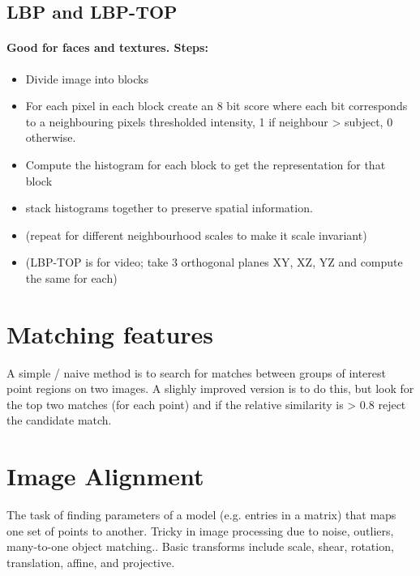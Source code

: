 \documentclass[]{article}
\begin{document}
	\subsection{LBP and LBP-TOP}
	\paragraph{Good for faces and textures. Steps:}
	\begin{itemize}
		\item Divide image into blocks
		\item For each pixel in each block create an 8 bit score where each bit corresponds to a neighbouring pixels thresholded intensity, 1 if neighbour > subject, 0 otherwise.
		\item Compute the histogram for each block to get the representation for that block
		\item stack histograms together to preserve spatial information.
		\item (repeat for different neighbourhood scales to make it scale invariant)
		\item (LBP-TOP is for video; take 3 orthogonal planes XY, XZ, YZ and compute the same for each)
	\end{itemize}
	
	
\section{Matching features}
	\textnormal{A simple / naive method is to search for matches between groups of interest point regions on two images. A slighly improved version is to do this, but look for the top two matches (for each point) and if the relative similarity is > 0.8 reject the candidate match.}
	
\section{Image Alignment}
	\textnormal{The task of finding parameters of a model (e.g. entries in a matrix) that maps one set of points to another. Tricky in image processing due to noise, outliers, many-to-one object matching.. Basic transforms include scale, shear, rotation, translation, affine, and projective.}
	
\end{document}
